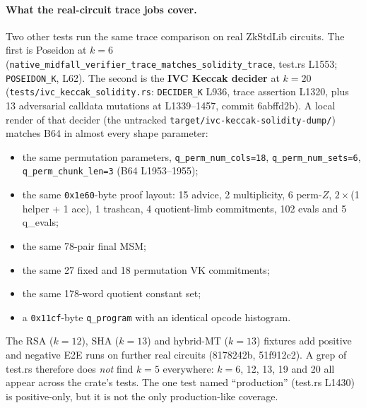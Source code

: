 \paragraph{What the real-circuit trace jobs cover.}
Two other tests run the same trace comparison on real ZkStdLib
circuits. The first is Poseidon at $k=6$
(\texttt{native\_\allowbreak{}midfall\_\allowbreak{}verifier\_\allowbreak{}trace\_\allowbreak{}matches\_\allowbreak{}solidity\_\allowbreak{}trace},
test.rs L1553; \texttt{POSEIDON\_K}, L62). The second is the
\textbf{IVC Keccak decider} at $k=20$
(\texttt{tests/\allowbreak{}ivc\_\allowbreak{}keccak\_\allowbreak{}solidity.rs}: \texttt{DECIDER\_K}
L936, trace assertion L1320, plus 13 adversarial calldata
mutations at L1339--1457, commit 6abffd2b). A local render of
that decider (the untracked \texttt{target/\allowbreak{}ivc-keccak-solidity-dump/\allowbreak{}})
matches B64 in almost every shape parameter:
\begin{itemize}[leftmargin=1.4em,itemsep=2pt]
\item the same permutation parameters,
  \texttt{q\_\allowbreak{}perm\_\allowbreak{}num\_\allowbreak{}cols=18}, \texttt{q\_\allowbreak{}perm\_\allowbreak{}num\_\allowbreak{}sets=6},
  \texttt{q\_\allowbreak{}perm\_\allowbreak{}chunk\_\allowbreak{}len=3} (B64 L1953--1955);
\item the same \texttt{0x1e60}-byte proof layout: 15 advice, 2
  multiplicity, 6 perm-$Z$, $2\times$(1 helper + 1 acc), 1
  trashcan, 4 quotient-limb commitments, 102 evals and 5 q\_evals;
\item the same 78-pair final MSM;
\item the same 27 fixed and 18 permutation VK commitments;
\item the same 178-word quotient constant set;
\item a \texttt{0x11cf}-byte \texttt{q\_program} with an identical
  opcode histogram.
\end{itemize}
The RSA ($k=12$), SHA ($k=13$) and hybrid-MT ($k=13$) fixtures add
positive and negative E2E runs on further real circuits (8178242b,
51f912c2). A grep of test.rs therefore does \emph{not} find
$k=5$ everywhere: $k=6$, 12, 13, 19 and 20 all appear across the
crate's tests. The one test named ``production''
(test.rs L1430) is positive-only, but it is not the only
production-like coverage.

